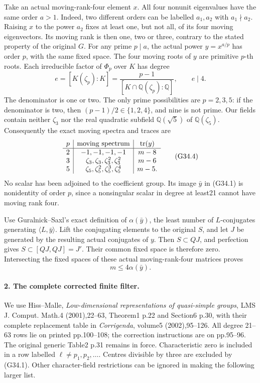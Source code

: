 Take an actual moving-rank-four element \(x\). All four
nonunit eigenvalues have the same order \(a>1\). Indeed, two
different orders can be labelled \(a_1,a_2\) with
\(a_1\nmid a_2\). Raising \(x\) to the power \(a_2\) fixes at least one,
but not all, of its four moving eigenvectors. Its moving rank
is then one, two or three, contrary to the stated property of
the original \(G\). For any prime \(p\mid a\), the actual
power \(y=x^{a/p}\) has order \(p\), with the same fixed space.
The four moving roots of \(y\) are primitive \(p\)-th roots.
Each irreducible factor of \(\Phi_p\) over \(K\) has degree
\[
 e=[K(\zeta_p):K]
   =\frac{p-1}{[K\cap\mathbb Q(\zeta_p):\mathbb Q]},
 \qquad e\mid4.                                    \tag{G34.3}
\]
The denominator is one or two. The only prime possibilities
are \(p=2,3,5\): if the denominator is two, then
\((p-1)/2\in\{1,2,4\}\), and nine is not prime.
Our fields contain neither \(\zeta_3\) nor the real quadratic
subfield \(\mathbb Q(\sqrt5)\) of \(\mathbb Q(\zeta_5)\).
Consequently the exact moving spectra and traces are
\[
\begin{array}{c|c|c}
p&\hbox{moving spectrum}&\operatorname{tr}(y)\\\hline
2&-1,-1,-1,-1&m-8\\
3&\zeta_3,\zeta_3,\zeta_3^2,\zeta_3^2&m-6\\
5&\zeta_5,\zeta_5^2,\zeta_5^3,\zeta_5^4&m-5.
\end{array}                                           \tag{G34.4}
\]
No scalar has been adjoined to the coefficient group.
Its image \(\bar y\) in (G34.1) is nonidentity of order \(p\),
since a nonsingular scalar in degree at least21 cannot have
moving rank four.

Use Guralnick--Saxl's exact definition of \(\alpha(\bar y)\),
the least number of \(L\)-conjugates generating
\(\langle L,\bar y\rangle\). Lift the conjugating elements
to the original \(S\), and let \(J\) be generated by the
resulting actual conjugates of \(y\). Then \(S\subset QJ\),
and perfection gives \(S\subset[QJ,QJ]=J'\).
Their common fixed space is therefore zero. Intersecting the
fixed spaces of these actual moving-rank-four matrices proves
\[
                       m\le4\alpha(\bar y).             \tag{G34.5}
\]

\paragraph{2. The complete corrected finite filter.}
We use Hiss--Malle, \emph{Low-dimensional representations of
quasi-simple groups}, LMS J. Comput. Math.4 (2001),22--63,
Theorem1 p.22 and Section6 p.30, with their complete replacement
table in \emph{Corrigenda}, volume5 (2002),95--126. All degree
21--63 rows lie on printed pp.100--108; the correction instructions
are on pp.95--96. The original generic Table2 p.31 remains in
force. Characteristic zero is included in a row labelled
\(\ell\ne p_1,p_2,\ldots\). Centres divisible by three are
excluded by (G34.1). Other character-field restrictions can be
ignored in making the following larger list.

